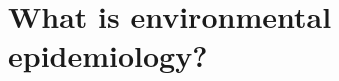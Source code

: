 \documentclass[slidestop,compress,serif,10pt]{beamer}
\begin{document}
\section{What is environmental epidemiology?}
%
\end{document}
